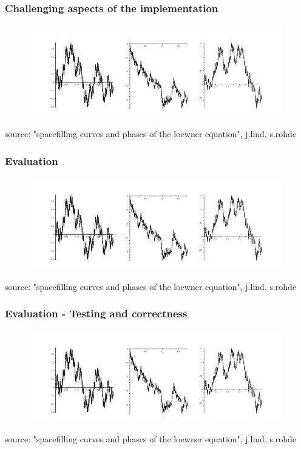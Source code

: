 \documentclass[10pt, compress]{beamer}
\begin{document}
\begin{frame}[fragile]
  \frametitle{Challenging aspects of the implementation}

  


\begin{figure}
  \centering
 \includegraphics[width=11cm,height=4cm]{intro2.png}
\end{figure}
\tiny
source: "spacefilling curves and phases of the loewner equation", j.lind, s.rohde
\normalsize
\end{frame}

\begin{frame}[fragile]
  \frametitle{Evaluation}

  

\begin{figure}
  \centering
 \includegraphics[width=11cm,height=4cm]{intro2.png}
\end{figure}
\tiny
source: "spacefilling curves and phases of the loewner equation", j.lind, s.rohde
\normalsize
\end{frame}

\begin{frame}[fragile]
  \frametitle{Evaluation - Testing and correctness}

  

\begin{figure}
  \centering
 \includegraphics[width=11cm,height=4cm]{intro2.png}
\end{figure}
\tiny
source: "spacefilling curves and phases of the loewner equation", j.lind, s.rohde
\normalsize
\end{frame}
\end{document}
